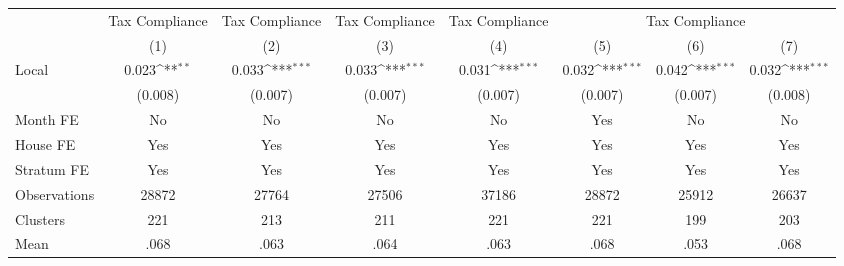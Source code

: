 {
\def\sym#1{\ifmmode^{#1}\else\(^{#1}\)\fi}
\begin{tabular}{l*{7}{c}}
\hline\hline
                &\multicolumn{1}{c}{Tax Compliance}&\multicolumn{1}{c}{Tax Compliance}&\multicolumn{1}{c}{Tax Compliance}&\multicolumn{1}{c}{Tax Compliance}&\multicolumn{3}{c}{Tax Compliance}                      \\
                &\multicolumn{1}{c}{(1)}         &\multicolumn{1}{c}{(2)}         &\multicolumn{1}{c}{(3)}         &\multicolumn{1}{c}{(4)}         &\multicolumn{1}{c}{(5)}         &\multicolumn{1}{c}{(6)}         &\multicolumn{1}{c}{(7)}         \\
\hline
Local           &    0.023\sym{**} &    0.033\sym{***}&    0.033\sym{***}&    0.031\sym{***}&    0.032\sym{***}&    0.042\sym{***}&    0.032\sym{***}\\
                &  (0.008)         &  (0.007)         &  (0.007)         &  (0.007)         &  (0.007)         &  (0.007)         &  (0.008)         \\
Month FE        &       No         &       No         &       No         &       No         &      Yes         &       No         &       No         \\
House FE        &      Yes         &      Yes         &      Yes         &      Yes         &      Yes         &      Yes         &      Yes         \\
Stratum FE      &      Yes         &      Yes         &      Yes         &      Yes         &      Yes         &      Yes         &      Yes         \\
\hline
Observations    &    28872         &    27764         &    27506         &    37186         &    28872         &    25912         &    26637         \\
Clusters        &      221         &      213         &      211         &      221         &      221         &      199         &      203         \\
Mean            &     .068         &     .063         &     .064         &     .063         &     .068         &     .053         &     .068         \\
\hline\hline
\end{tabular}
}
